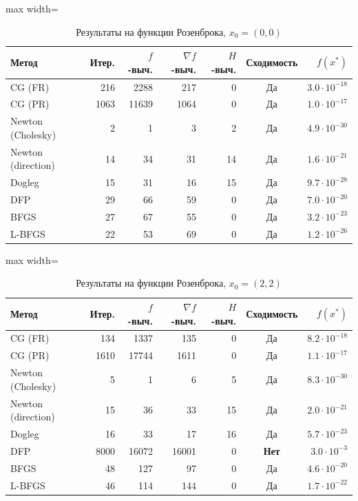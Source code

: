 \documentclass[12pt]{article}
\begin{document}
\begin{table}[H]
\centering
\caption{Результаты на функции Розенброка, $x_0 = (0, 0)$}
\begin{adjustbox}{max width=\textwidth}
\begin{tabular}{lrrrrcr}
\toprule
\textbf{Метод} & \textbf{Итер.} & \textbf{$f$-выч.} & \textbf{$\nabla f$-выч.} & \textbf{$H$-выч.} & \textbf{Сходимость} & $f(x^*)$ \\
\midrule
CG (FR)            & 216  & 2288  & 217   & 0  & Да  & $3.0 \cdot 10^{-18}$ \\
CG (PR)            & 1063 & 11639 & 1064  & 0  & Да  & $1.0 \cdot 10^{-17}$ \\
Newton (Cholesky)  & 2    & 1     & 3     & 2  & Да  & $4.9 \cdot 10^{-30}$ \\
Newton (direction) & 14   & 34    & 31    & 14 & Да  & $1.6 \cdot 10^{-21}$ \\
Dogleg             & 15   & 31    & 16    & 15 & Да  & $9.7 \cdot 10^{-28}$ \\
DFP                & 29   & 66    & 59    & 0  & Да  & $7.0 \cdot 10^{-20}$ \\
BFGS               & 27   & 67    & 55    & 0  & Да  & $3.2 \cdot 10^{-23}$ \\
L-BFGS             & 22   & 53    & 69    & 0  & Да  & $1.2 \cdot 10^{-26}$ \\
\bottomrule
\end{tabular}
\end{adjustbox}
\end{table}

\begin{table}[H]
\centering
\caption{Результаты на функции Розенброка, $x_0 = (2, 2)$}
\begin{adjustbox}{max width=\textwidth}
\begin{tabular}{lrrrrcr}
\toprule
\textbf{Метод} & \textbf{Итер.} & \textbf{$f$-выч.} & \textbf{$\nabla f$-выч.} & \textbf{$H$-выч.} & \textbf{Сходимость} & $f(x^*)$ \\
\midrule
CG (FR)            & 134  & 1337  & 135    & 0  & Да  & $8.2 \cdot 10^{-18}$ \\
CG (PR)            & 1610 & 17744 & 1611   & 0  & Да  & $1.1 \cdot 10^{-17}$ \\
Newton (Cholesky)  & 5    & 1     & 6      & 5  & Да  & $8.3 \cdot 10^{-30}$ \\
Newton (direction) & 15   & 36    & 33     & 15 & Да  & $2.0 \cdot 10^{-21}$ \\
Dogleg             & 16   & 33    & 17     & 16 & Да  & $5.7 \cdot 10^{-23}$ \\
DFP                & 8000 & 16072 & 16001  & 0  & \textbf{Нет} & $3.0 \cdot 10^{-3}$ \\
BFGS               & 48   & 127   & 97     & 0  & Да  & $4.6 \cdot 10^{-20}$ \\
L-BFGS             & 46   & 114   & 144    & 0  & Да  & $1.7 \cdot 10^{-22}$ \\
\bottomrule
\end{tabular}
\end{adjustbox}
\end{table}
\end{document}
